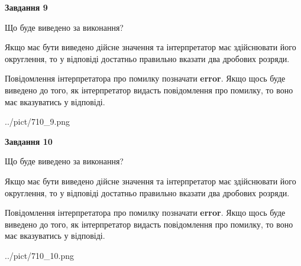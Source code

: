 \documentclass[12pt, ukrainian]{article}
\begin{document}
{\begin {Large}
{\begin {center}\textbf{Завдання 9}\end {center}}\par
Що буде виведено за виконання? \par

Якщо має бути виведено дійсне значення та інтерпретатор має здійснювати його округлення, 
то у відповіді достатньо правильно вказати два дробових розряди.

Повідомлення інтерпретатора про помилку позначати \textbf{error}.
Якщо щось буде виведено до того, як інтерпретатор видасть повідомлення про помилку, 
то воно має вказуватись у відповіді. \par

\begin{center}
	{../pict/710_9.png}
\end{center}
\newpage

{\begin {center}\textbf{Завдання 10}\end {center}}\par
Що буде виведено за виконання? \par

Якщо має бути виведено дійсне значення та інтерпретатор має здійснювати його округлення, 
то у відповіді достатньо правильно вказати два дробових розряди.

Повідомлення інтерпретатора про помилку позначати \textbf{error}.
Якщо щось буде виведено до того, як інтерпретатор видасть повідомлення про помилку, 
то воно має вказуватись у відповіді. \par

\begin{center}
	{../pict/710_10.png}
\end{center}
\newpage

\end {Large}}
\end{document}
